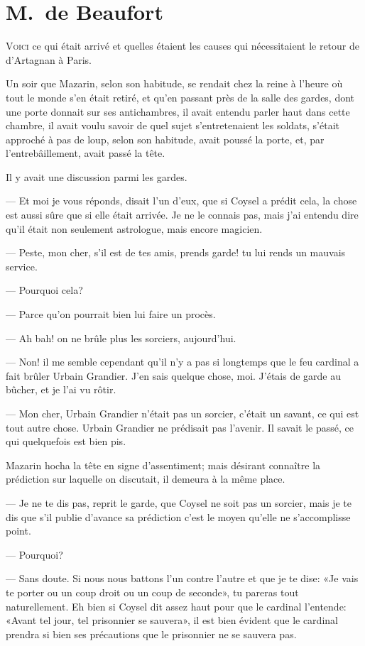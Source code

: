 \chapter{M.~de Beaufort}

\lettrine{V}{oici} ce qui était arrivé et quelles étaient les causes qui nécessitaient le retour de d'Artagnan à Paris.

\zz
Un soir que Mazarin, selon son habitude, se rendait chez la reine à l'heure où tout le monde s'en était retiré, et qu'en passant près de la salle des gardes, dont une porte donnait sur ses antichambres, il avait entendu parler haut dans cette chambre, il avait voulu savoir de quel sujet s'entretenaient les soldats, s'était approché à pas de loup, selon son habitude, avait poussé la porte, et, par l'entrebâillement, avait passé la tête.

Il y avait une discussion parmi les gardes.

— Et moi je vous réponds, disait l'un d'eux, que si Coysel a prédit cela, la chose est aussi sûre que si elle était arrivée. Je ne le connais pas, mais j'ai entendu dire qu'il était non seulement astrologue, mais encore magicien.

— Peste, mon cher, s'il est de tes amis, prends garde! tu lui rends un mauvais service.

— Pourquoi cela?

— Parce qu'on pourrait bien lui faire un procès.

— Ah bah! on ne brûle plus les sorciers, aujourd'hui.

— Non! il me semble cependant qu'il n'y a pas si longtemps que le feu cardinal a fait brûler Urbain Grandier. J'en sais quelque chose, moi. J'étais de garde au bûcher, et je l'ai vu rôtir.

— Mon cher, Urbain Grandier n'était pas un sorcier, c'était un savant, ce qui est tout autre chose. Urbain Grandier ne prédisait pas l'avenir. Il savait le passé, ce qui quelquefois est bien pis.

Mazarin hocha la tête en signe d'assentiment; mais désirant connaître la prédiction sur laquelle on discutait, il demeura à la même place.

— Je ne te dis pas, reprit le garde, que Coysel ne soit pas un sorcier, mais je te dis que s'il publie d'avance sa prédiction c'est le moyen qu'elle ne s'accomplisse point.

— Pourquoi?

— Sans doute. Si nous nous battons l'un contre l'autre et que je te dise: «Je vais te porter ou un coup droit ou un coup de seconde», tu pareras tout naturellement. Eh bien si Coysel dit assez haut pour que le cardinal l'entende: «Avant tel jour, tel prisonnier se sauvera», il est bien évident que le cardinal prendra si bien ses précautions que le prisonnier ne se sauvera pas.

